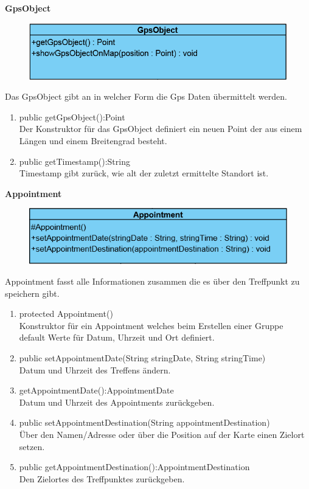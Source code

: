\textbf{GpsObject}
\begin{figure}[H]
	\includegraphics[scale = .5]{res/umlClasses/GpsObject.png}
	\centering
\end{figure}
Das GpsObject gibt an in welcher Form die Gps Daten übermittelt werden.
\begin{enumerate}
	\item public getGpsObject():Point\\
		Der Konstruktor für das GpsObject definiert ein neuen Point der aus einem Längen und einem Breitengrad besteht. 
	\item public getTimestamp():String \\
		Timestamp gibt zurück, wie alt der zuletzt ermittelte Standort ist.
\end{enumerate}

\textbf{Appointment}
\begin{figure}[H]
	\includegraphics[scale = .6]{res/umlClasses/Appointment.png}
	\centering
\end{figure}
Appointment fasst alle Informationen zusammen die es über den Treffpunkt zu speichern gibt.
\begin{enumerate}
	\item protected Appointment()\\	
		Konstruktor für ein Appointment welches beim Erstellen einer Gruppe default Werte für Datum, Uhrzeit und Ort definiert.
	\item public setAppointmentDate(String stringDate, String stringTime)\\
		Datum und Uhrzeit des Treffens ändern.
	\item getAppointmentDate():AppointmentDate \\
		Datum und Uhrzeit des Appointments zurückgeben.
	\item public setAppointmentDestination(String appointmentDestination)\\
		Über den Namen/Adresse oder über die Position auf der Karte einen Zielort setzen.
	\item public getAppointmentDestination():AppointmentDestination\\
		Den Zielortes des Treffpunktes zurückgeben.
\end{enumerate}

